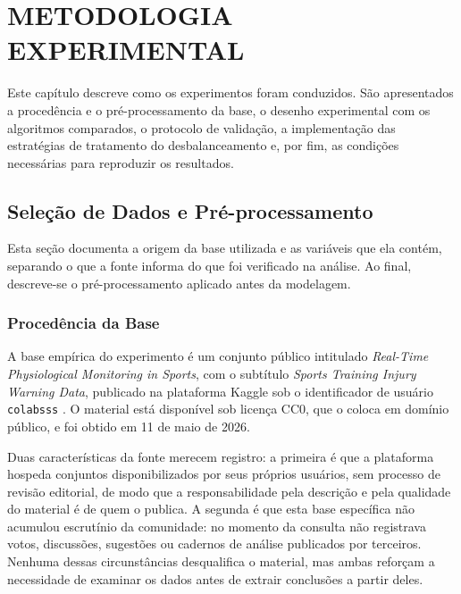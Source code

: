 \chapter{METODOLOGIA EXPERIMENTAL}

Este capítulo descreve como os experimentos foram conduzidos. São apresentados a procedência e o pré-processamento da base, o desenho experimental com os algoritmos comparados, o protocolo de validação, a implementação das estratégias de tratamento do desbalanceamento e, por fim, as condições necessárias para reproduzir os resultados.

\section{Seleção de Dados e Pré-processamento}

Esta seção documenta a origem da base utilizada e as variáveis que ela contém, separando o que a fonte informa do que foi verificado na análise. Ao final, descreve-se o pré-processamento aplicado antes da modelagem.

\subsection{Procedência da Base}
\label{sec:procedencia}

A base empírica do experimento é um conjunto público intitulado \textit{Real-Time Physiological Monitoring in Sports}, com o subtítulo \textit{Sports Training Injury Warning Data}, publicado na plataforma Kaggle sob o identificador de usuário \texttt{colabsss} \cite{colabsss2025}. O material está disponível sob licença CC0, que o coloca em domínio público, e foi obtido em 11 de maio de 2026.

Duas características da fonte merecem registro: a primeira é que a plataforma hospeda conjuntos disponibilizados por seus próprios usuários, sem processo de revisão editorial, de modo que a responsabilidade pela descrição e pela qualidade do material é de quem o publica. A segunda é que esta base específica não acumulou escrutínio da comunidade: no momento da consulta não registrava votos, discussões, sugestões ou cadernos de análise publicados por terceiros. Nenhuma dessas circunstâncias desqualifica o material, mas ambas reforçam a necessidade de examinar os dados antes de extrair conclusões a partir deles.

